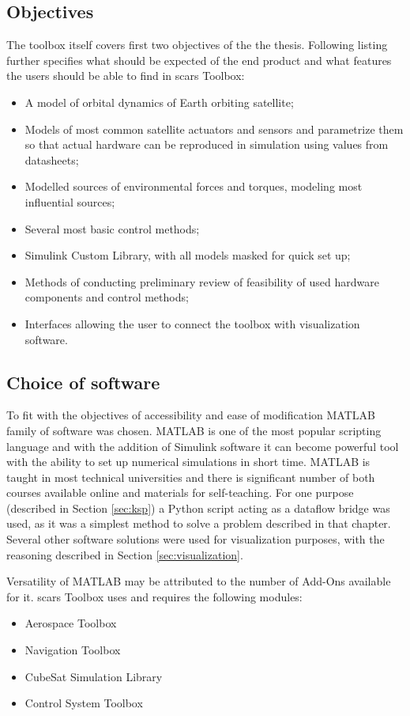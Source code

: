 \subsection{Objectives}\label{toolbox:objectives}
    The toolbox itself covers first two objectives of the the thesis. Following listing further specifies what should be expected of the end product and what features the users should be able to find in \ac{scars} Toolbox: 
    \begin{itemize}
        \item A model of orbital dynamics of Earth orbiting satellite;
        \item Models of most common satellite actuators and sensors and parametrize them so that actual hardware can be reproduced in simulation using values from datasheets;
        \item Modelled sources of environmental forces and torques, modeling most influential sources;
        \item Several most basic control methods;
        \item Simulink Custom Library, with all models masked for quick set up;
        \item Methods of conducting preliminary review of feasibility of used hardware components and control methods;
        \item Interfaces allowing the user to connect the toolbox with visualization software.
    \end{itemize}

\subsection{Choice of software}\label{toolbox:software}
    To fit with the objectives of accessibility and ease of modification MATLAB family of software was chosen. MATLAB is one of the most popular scripting language and with the addition of Simulink software it can become powerful tool with the ability to set up numerical simulations in short time. MATLAB is taught in most technical universities and there is significant number of both courses available online and materials for self-teaching. For one purpose (described in Section \ref{sec:ksp}) a Python script acting as a dataflow bridge was used, as it was a simplest method to solve a problem described in that chapter. Several other software solutions were used for visualization purposes, with the reasoning described in Section \ref{sec:visualization}.

    Versatility of MATLAB may be attributed to the number of Add-Ons available for it. \ac{scars} Toolbox uses and requires the following modules:
    \begin{itemize}
        \item Aerospace Toolbox
        \item Navigation Toolbox
        \item CubeSat Simulation Library
        \item Control System Toolbox
    \end{itemize}
    
